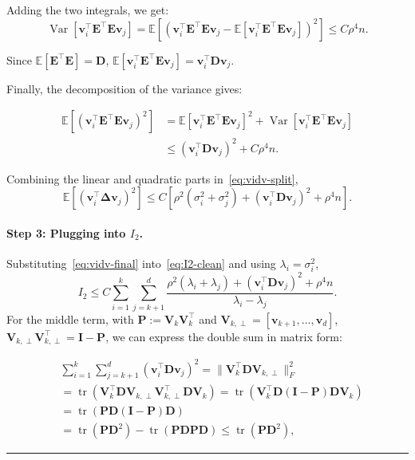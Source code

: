 \documentclass{article}
\newcommand{\Ex}[1]{\mbox{}\mathbb{E}\left[#1\right]}
\newcommand{\Var}{\operatorname{Var}}   %
\newcommand{\ts}{\top}
\newcommand{\vb}{\mathbf{v}}
\newcommand{\Db}{\mathbf{D}}
\newcommand{\Eb}{\mathbf{E}}
\newcommand{\Ib}{\mathbf{I}}
\newcommand{\Pb}{\mathbf{P}}
\newcommand{\Vb}{\mathbf{V}}
\newcommand{\BlackBox}{\rule{1.5ex}{1.5ex}}  %
\newenvironment{proof}{\par\noindent{\bf Proof\ }}{\hfill\BlackBox\par\medskip}
\newcommand{\tr}{\mathop{\mathrm{tr}}}
\newcommand{\rbr}[1]{\left(#1\right)}
\newcommand{\sbr}[1]{\left[#1\right]}
\newcommand{\Deltab}{\boldsymbol{\Delta}}
\begin{document}
\begin{proof}
Adding the two integrals, we get:
\begin{equation}
   \Var[\vb_i^\ts \Eb^\ts \Eb \vb_j] = \Ex{\rbr{\vb_i^\ts \Eb^\ts \Eb \vb_j - \Ex{\vb_i^\ts \Eb^\ts \Eb \vb_j}}^2} \le C \rho^4 n.
\end{equation}

Since $\Ex{\Eb^\ts \Eb} = \Db$, $\Ex{\vb_i^\ts \Eb^\ts \Eb \vb_j} = \vb_i^\ts \Db \vb_j$.

Finally, the decomposition of the variance gives:

\begin{align}
    \Ex{(\vb_i^\ts \Eb^\ts \Eb \vb_j)^2} &= \Ex{\vb_i^\ts \Eb^\ts \Eb \vb_j}^2 + \Var [\vb_i^\ts \Eb^\ts \Eb \vb_j]\\
    &\le (\vb_i^\ts \Db \vb_j)^2 + C\rho^4 n.
\end{align}

Combining the linear and quadratic parts in~\eqref{eq:vidv-split},
\begin{equation}\label{eq:vidv-final}
    \Ex{(\vb_i^\ts\Deltab\vb_j)^2} \le C\sbr{\rho^2(\sigma_i^2+\sigma_j^2) + (\vb_i^\ts \Db \vb_j)^2 + \rho^4 n}.
\end{equation}

\paragraph{Step 3: Plugging into $I_2$.}
Substituting~\eqref{eq:vidv-final} into~\eqref{eq:I2-clean} and using $\lambda_i=\sigma_i^2$,
\begin{equation*}
    I_2 \le C\sum_{i=1}^{k}\sum_{j=k+1}^{d}\frac{\rho^2(\lambda_i+\lambda_j) + (\vb_i^\ts \Db \vb_j)^2 + \rho^4 n}{\lambda_i-\lambda_j}.
\end{equation*}
For the middle term, with $\Pb := \Vb_k\Vb_k^\ts$ and $\Vb_{k,\perp}=[\vb_{k+1},\dots,\vb_d]$, $\Vb_{k,\perp}\Vb_{k,\perp}^\ts = \Ib - \Pb$, we can express the double sum in matrix form:

\begin{align}
    &\sum_{i=1}^{k}\sum_{j=k+1}^{d}(\vb_i^\ts \Db \vb_j)^2 =  \|\Vb_k^\ts \Db \Vb_{k,\perp}\|_F^2 \\
    &= \tr \rbr{ \Vb_k^\ts \Db \Vb_{k,\perp} \Vb_{k,\perp}^\ts \Db \Vb_k } = \tr \rbr{\Vb_k^\ts \Db (\Ib -\Pb) \Db \Vb_k}\\
    &= \tr \rbr{\Pb \Db (\Ib -\Pb) \Db }\\
    &= \tr(\Pb\Db^2) - \tr(\Pb\Db\Pb\Db) \le \tr(\Pb\Db^2),
\end{align}



\end{proof}
\end{document}

